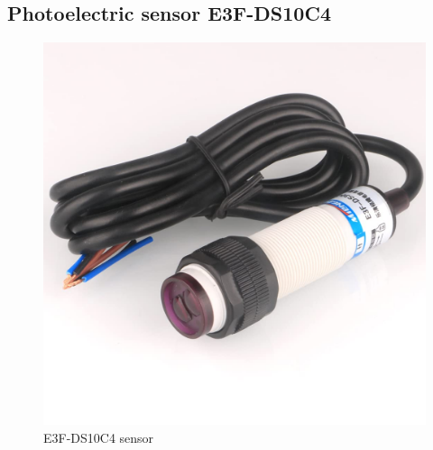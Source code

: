 \documentclass[a4paper,11pt]{report}
\theoremstyle{definition}
\theoremstyle{plain}
\begin{document}
        \subsection{Photoelectric sensor E3F-DS10C4}
            \begin{figure}[htbp]
                \centering
                \includegraphics[scale=0.1]{images/sensor.jpg}
                \caption{E3F-DS10C4 sensor}
                \label{sensor}
            \end{figure}
        
\end{document}

